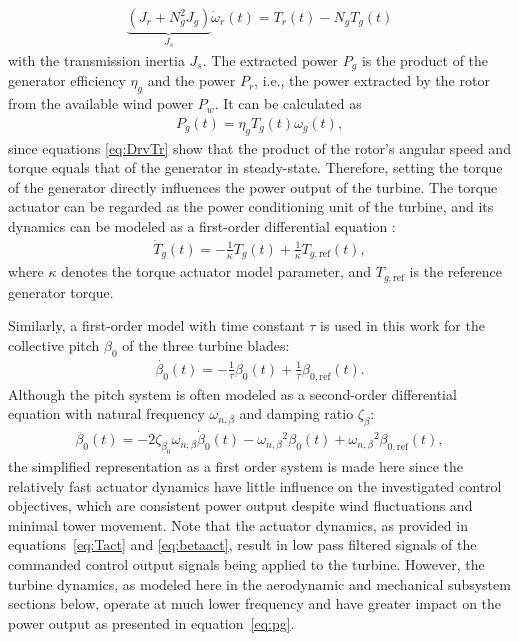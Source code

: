 \begin{align*}
    \underbrace{(J_r + N^2_g J_g)}_{J_s}\dot{\omega}_r(t)= T_r(t) - N_g T_g(t)
\end{align*}
with the transmission inertia $J_s$. The extracted power $P_{g}$ is the product of the generator efficiency $\eta_{g}$ and the power $P_r$, i.e., the power extracted by the rotor from the available wind power $P_w$. It can be calculated as 
\begin{align}\label{eq:pg}
    P_{g}(t) = \eta_{g} T_{g}(t) \omega_{g}(t),
\end{align}
since equations \eqref{eq:DrvTr} show that the product of the rotor's angular speed and torque equals that of the generator in steady-state. Therefore, setting the torque of the generator directly influences the power output of the turbine.
%
The torque actuator can be regarded as the power conditioning unit of the turbine, and its dynamics can be modeled as a first-order differential equation \cite{odgaard2013fault}:
\begin{align}\label{eq:Tact}
    \dot{T}_{g}(t) = -\frac{1}{\kappa} T_{g}(t) + \frac{1}{\kappa} T_{g,\text{ref}}(t), 
\end{align}
where $\kappa$ denotes the torque actuator model parameter, and $T_{g,\text{ref}}$ is the reference generator torque.

Similarly, a first-order model with time constant $\tau$ is used in this work for the collective pitch $\beta_0$ of the three turbine blades:
\begin{align}\label{eq:betaact}
    \dot{\beta_0}(t) = -\frac{1}{\tau}\beta_0(t) + \frac{1}{\tau}\beta_{0,\text{ref}}(t).
\end{align}
Although the pitch system is often modeled as a second-order differential equation with natural frequency $\omega_{n,\beta}$ and damping ratio $\zeta_{\beta}$:
\begin{align*}
    \ddot{\beta_0}(t) = -2\zeta_{\beta_0} \omega_{n,\beta} \dot{\beta}_0(t) - {\omega_{n,\beta}}^2 \beta_0(t) + {\omega_{n,\beta}}^2 \beta_{0,\text{ref}}(t),
\end{align*}
the simplified representation as a first order system is made here since the relatively fast actuator dynamics have little influence on the investigated control objectives, which are consistent power output despite wind fluctuations and minimal tower movement. Note that the actuator dynamics, as provided in equations~\eqref{eq:Tact} and \eqref{eq:betaact}, result in low pass filtered signals of the commanded control output signals being applied to the turbine. However, the turbine dynamics, as modeled here in the aerodynamic and mechanical subsystem sections below, operate at much lower frequency and have greater impact on the power output as presented in equation~\eqref{eq:pg}.
